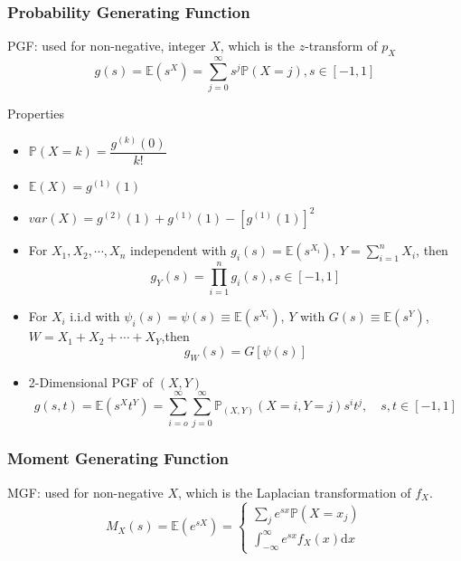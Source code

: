 \subsubsection{Probability Generating Function}
    PGF: used for non-negative, integer $X$, which is the $ z $-transform of $ p_X $
    \begin{equation}
        g(s)=\mathbb{E}(s^X)=\sum_{j=0}^\infty s^j\mathbb{P}(X=j)    ,s\in[-1,1]
    \end{equation}

\begin{point}
        Properties
\end{point}
    \begin{itemize}[topsep=2pt,itemsep=0pt]
        \item $\mathbb{P}(X=k)=\dfrac{g^{(k)}(0)}{k!}$
        \item $\mathbb{E}(X)=g^{(1)}(1)$
        \item $var(X)=g^{(2)}(1)+g^{(1)}(1)-[g^{(1)}(1)]^2 $
        \item For $X_1,X_2,\cdots,X_n$ independent with $g_i(s)=\mathbb{E}(s^{X_i})$, $Y={\displaystyle \sum_{i=1}^n} X_i$, then
        \begin{equation}    
            g_Y(s)=\prod_{i=1}^n g_i(s),s\in[-1,1]
        \end{equation}
        \item For ${X_i}$ i.i.d with $\psi_i(s)=\psi(s)\equiv \mathbb{E}(s^{X_i})$, $Y$ with $G(s)\equiv\mathbb{E}(s^{Y})$, $W=X_1+X_2+\cdots +X_Y$,then
        \begin{equation}    
            g_W(s)=G[\psi(s)]    
        \end{equation}
        \item 2-Dimensional PGF of $(X,Y)$
        \begin{equation}    
            g(s,t)=\mathbb{E}(s^Xt^Y)=\sum_{i=o}^\infty\sum_{j=0}^\infty \mathbb{P}_{(X,Y)}(X=i,Y=j)s^it^j,\quad s,t\in[-1,1]
        \end{equation}
    \end{itemize}
\subsubsection{Moment Generating Function}
    MGF: used for non-negative $ X $, which is the Laplacian transformation of $ f_X $.
    \begin{equation}
        M_X(s)=\mathbb{E}(e^{sX})=\begin{cases}
            \sum_je^{sx}\mathbb{P}(X=x_j)\\
            \int_{-\infty}^\infty e^{sx}f_X(x)\mathrm{d}x
        \end{cases}
    \end{equation}

